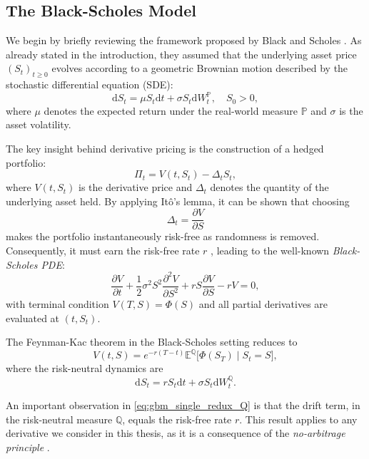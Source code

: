 \documentclass[12pt]{report} %
\theoremstyle{plain} %
\theoremstyle{definition} %
\theoremstyle{remark} %
\begin{document}
\subsection{The Black-Scholes Model}\label{sec:bs_dynamics}

We begin by briefly reviewing the framework proposed by Black and Scholes \cite{black1973}. As already stated in the introduction, they assumed that the
underlying asset price $(S_t)_{t\ge0}$ evolves according to a geometric Brownian motion described by the stochastic
differential equation (SDE):
\begin{equation}\label{eq:gbm_single_redux}
\mathrm{d}S_t = \mu S_t\mathrm{d}t + \sigma S_t\mathrm{d}W^{\mathbb{P}}_t,\quad S_0>0,
\end{equation}
where $\mu$ denotes the expected return under the real-world measure $\mathbb{P}$ and $\sigma$ is the asset volatility.

The key insight behind derivative pricing is the construction of a hedged portfolio:
\[
\Pi_t = V(t,S_t) - \Delta_t S_t,
\]
where $V(t,S_t)$ is the derivative price and $\Delta_t$ denotes the quantity of the underlying asset held.
By applying Itô's lemma, it can be shown that choosing
\[
\Delta_t = \frac{\partial V}{\partial S}
\]
makes the portfolio instantaneously risk-free as randomness is removed. Consequently, it must earn the risk-free rate $r$ \cite{björk2004arbitrage}, leading to the
well-known \emph{Black-Scholes PDE}:
\begin{equation}\label{eq:BS_complete}
\frac{\partial V}{\partial t} + \frac{1}{2}\sigma^{2}S^{2}\frac{\partial^{2}V}{\partial S^{2}} + rS\frac{\partial V}{\partial S} - rV = 0,
\end{equation}
with terminal condition $V(T,S)=\Phi(S)$ and all partial derivatives are evaluated at $(t,S_t)$. 

The Feynman-Kac theorem in the Black-Scholes setting reduces to
\[
V(t,S) = e^{-r(T-t)}\mathbb{E}^{\mathbb{Q}}\bigl[\Phi(S_T)\mid S_t=S\bigr],
\]
where the risk-neutral dynamics are
\begin{equation}\label{eq:gbm_single_redux_Q}
	\mathrm{d}S_t = r S_t\mathrm{d}t + \sigma S_t\mathrm{d}W^{\mathbb{Q}}_t.
\end{equation}

An important observation in \eqref{eq:gbm_single_redux_Q} is that the drift term, in the risk-neutral measure $\mathbb{Q}$,
equals the risk-free rate $r$. This result applies to any derivative we consider in this thesis, as it is a consequence of the
\emph{no-arbitrage principle} \cite{björk2004arbitrage}.
\end{document}
